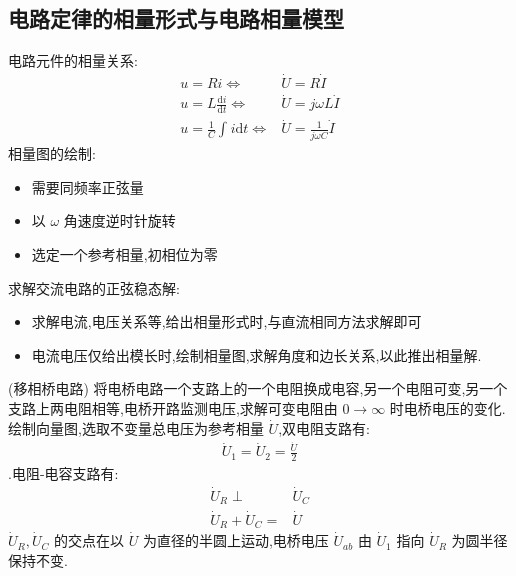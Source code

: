        \subsection{电路定律的相量形式与电路相量模型}
            电路元件的相量关系:
            \begin{align}
                u=Ri \Leftrightarrow& \dot{U}=R\dot{I}\nonumber\\
                u=L \frac{\mathrm{d}i}{\mathrm{d}t} \Leftrightarrow& \dot{U}=j\omega L\dot{I}\nonumber\\
                u=\frac{1}{C} \int_{}^{}i\mathrm{d}t \Leftrightarrow& \dot{U}=\frac{1}{j\omega C}\dot{I}\nonumber
            \end{align}
            相量图的绘制:
            \begin{itemize}
                \item 需要同频率正弦量
                \item 以 $\omega$ 角速度逆时针旋转
                \item 选定一个参考相量,初相位为零
            \end{itemize}
            求解交流电路的正弦稳态解:
            \begin{itemize}
                \item 求解电流,电压关系等,给出相量形式时,与直流相同方法求解即可
                \item 电流电压仅给出模长时,绘制相量图,求解角度和边长关系,以此推出相量解.
            \end{itemize}
            \begin{example}
                (移相桥电路) 将电桥电路一个支路上的一个电阻换成电容,另一个电阻可变,另一个支路上两电阻相等,电桥开路监测电压,求解可变电阻由 $0\rightarrow \infty$ 时电桥电压的变化.
            \newline\newline
                绘制向量图,选取不变量总电压为参考相量 $\dot{U}$,双电阻支路有:
                \begin{align}
                    \dot{U}_{1}=\dot{U}_{2}=\frac{\dot{U}}{2}\nonumber
                \end{align}
                .电阻-电容支路有:
                \begin{align}
                    \dot{U}_{R}\perp& \dot{U}_{C}\nonumber\\
                    \dot{U}_{R}+\dot{U}_{C}=&\dot{U}\nonumber
                \end{align}
                $\dot{U}_{R},\dot{U}_{C}$ 的交点在以 $\dot{U}$ 为直径的半圆上运动,电桥电压 $\dot{U}_{ab}$ 由 $\dot{U}_{1}$ 指向 $\dot{U}_{R}$ 为圆半径保持不变.
            \end{example}

